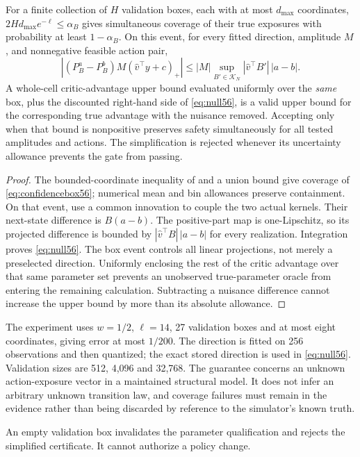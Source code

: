\begin{theorem}\label{thm:null56}
For a finite collection of $H$ validation boxes, each with at most $d_{\max}$ coordinates, $2Hd_{\max}e^{-\ell}\le\alpha_B$ gives simultaneous coverage of their true exposures with probability at least $1-\alpha_B$. On this event, for every fitted direction, amplitude $M$, and nonnegative feasible action pair,
\begin{equation}\label{eq:null56}
 |(P_B^a-P_B^b)M(\widehat v^\top y+c)_+|
 \le |M|\sup_{B'\in\mathcal K_N}|\widehat v^\top B'|\,|a-b|.
\end{equation}
A whole-cell critic-advantage upper bound evaluated uniformly over the \emph{same} box, plus the discounted right-hand side of \eqref{eq:null56}, is a valid upper bound for the corresponding true advantage with the nuisance removed. Accepting only when that bound is nonpositive preserves safety simultaneously for all tested amplitudes and actions. The simplification is rejected whenever its uncertainty allowance prevents the gate from passing.
\end{theorem}
\begin{proof}
The bounded-coordinate inequality of \citet{hoeffding1963} and a union bound give coverage of \eqref{eq:confidencebox56}; numerical mean and bin allowances preserve containment. On that event, use a common innovation to couple the two actual kernels. Their next-state difference is $B(a-b)$. The positive-part map is one-Lipschitz, so its projected difference is bounded by $|\widehat v^\top B|\,|a-b|$ for every realization. Integration proves \eqref{eq:null56}. The box event controls all linear projections, not merely a preselected direction. Uniformly enclosing the rest of the critic advantage over that same parameter set prevents an unobserved true-parameter oracle from entering the remaining calculation. Subtracting a nuisance difference cannot increase the upper bound by more than its absolute allowance.
\end{proof}

The experiment uses $w=1/2$, $\ell=14$, 27 validation boxes and at most eight coordinates, giving error at most $1/200$. The direction is fitted on 256 observations and then quantized; the exact stored direction is used in \eqref{eq:null56}. Validation sizes are 512, 4,096 and 32,768. The guarantee concerns an unknown action-exposure vector in a maintained structural model. It does not infer an arbitrary unknown transition law, and coverage failures must remain in the evidence rather than being discarded by reference to the simulator's known truth.

An empty validation box invalidates the parameter qualification and rejects the simplified certificate. It cannot authorize a policy change.

